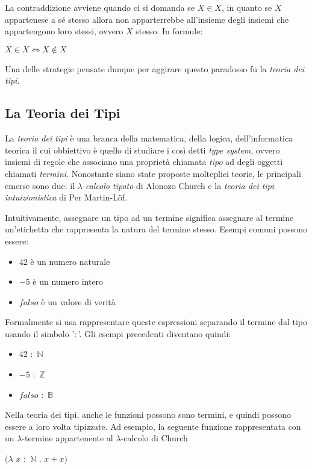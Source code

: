 \documentclass[12pt,a4paper]{report}
\begin{document}
La contraddizione avviene quando ci si domanda se $X \in X$, in quanto se $X$ appartenese
a sé stesso allora non apparterrebbe all'insieme degli insiemi che appartengono loro stessi,
ovvero $X$ stesso. In formule:
\begin{center}
  $X \in X \Leftrightarrow X \notin X$
\end{center}

Una delle strategie pensate dunque per aggirare questo paradosso fu la \textit{teoria dei tipi}.

\subsection{La Teoria dei Tipi}
La \textit{teoria dei tipi} è una branca della matematica, della logica, dell'informatica
teorica il cui obbiettivo è quello di studiare i così detti \textit{type system}, ovvero
insiemi di regole che associano una proprietà chiamata \textit{tipo} ad degli oggetti
chiamati \textit{termini}. Nonostante siano state proposte molteplici teorie, le principali
emerse sono due: il \textit{$\lambda$-calcolo tipato} di Alonozo Church e la \textit{teoria
dei tipi intuizionistica} di Per Martin-L{\"o}f.

Intuitivamente, assegnare un tipo ad un termine significa assegnare al termine un'etichetta
che rappresenta la natura del termine stesso. Esempi comuni possono essere: 
\begin{itemize}
  \item $42$ è un numero naturale 
  \item $-5$ è un numero intero
  \item $falso$ è un valore di verità 
\end{itemize}

Formalmente si usa rappresentare queste espressioni separando il termine dal tipo usando
il simbolo '$:$'. Gli esempi precedenti diventano quindi:
\begin{itemize}
  \item $42$ $:$ $\mathbb{N}$
  \item $-5$ $:$ $\mathbb{Z}$
  \item $falso$ $:$ $\mathbb{B}$ 
\end{itemize}

Nella teoria dei tipi, anche le funzioni possono sono termini, e quindi possono essere
a loro volta tipizzate. Ad esempio, la seguente funzione rappresentata con un $\lambda$-termine
appartenente al $\lambda$-calcolo di Church 
\begin{center}
  $(\lambda$ $x$ $:$ $\mathbb{N}$ $.$ $x + x)$
\end{center}
\end{document}
